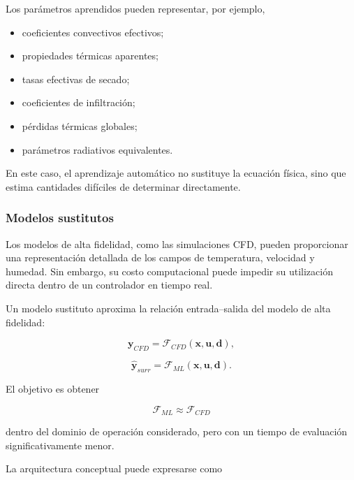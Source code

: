 Los parámetros aprendidos pueden representar, por ejemplo,

\begin{itemize}
    \item coeficientes convectivos efectivos;
    \item propiedades térmicas aparentes;
    \item tasas efectivas de secado;
    \item coeficientes de infiltración;
    \item pérdidas térmicas globales;
    \item parámetros radiativos equivalentes.
\end{itemize}

En este caso, el aprendizaje automático no sustituye la ecuación física, sino que estima cantidades difíciles de determinar directamente.

\subsubsection{Modelos sustitutos}

Los modelos de alta fidelidad, como las simulaciones CFD, pueden proporcionar una representación detallada de los campos de temperatura, velocidad y humedad. Sin embargo, su costo computacional puede impedir su utilización directa dentro de un controlador en tiempo real.

Un modelo sustituto aproxima la relación entrada--salida del modelo de alta fidelidad:

\begin{equation}
\mathbf{y}_{CFD}
=
\mathcal{F}_{CFD}
\left(
\mathbf{x},
\mathbf{u},
\mathbf{d}
\right),
\end{equation}

\begin{equation}
\hat{\mathbf{y}}_{surr}
=
\mathcal{F}_{ML}
\left(
\mathbf{x},
\mathbf{u},
\mathbf{d}
\right).
\end{equation}

El objetivo es obtener

\begin{equation}
\mathcal{F}_{ML}
\approx
\mathcal{F}_{CFD}
\end{equation}

dentro del dominio de operación considerado, pero con un tiempo de evaluación significativamente menor.

La arquitectura conceptual puede expresarse como

